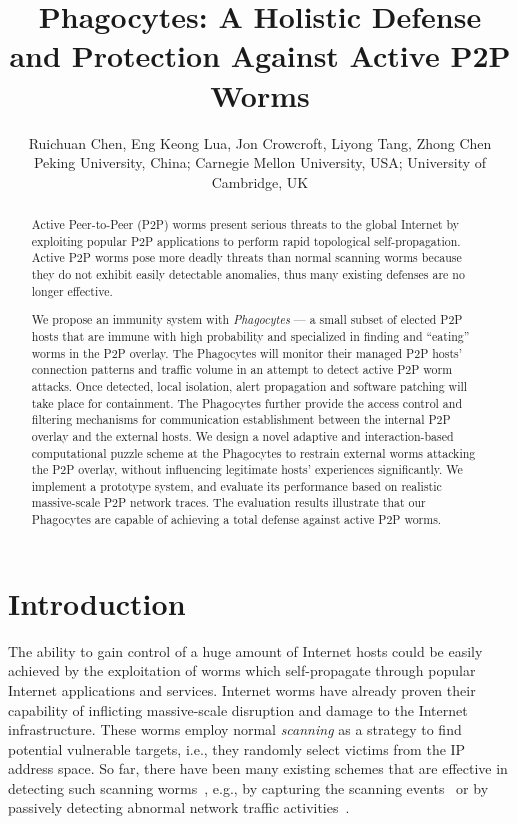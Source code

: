 \documentclass[times,10pt,twocolumn]{article}
\begin{document}
\title{Phagocytes: A Holistic Defense and Protection Against Active P2P Worms}

\author{Ruichuan Chen, Eng Keong Lua, Jon Crowcroft, Liyong Tang, Zhong Chen\\
Peking University, China; Carnegie Mellon University,
USA; University of Cambridge, UK}

\maketitle
\thispagestyle{empty}

\begin{abstract}

Active Peer-to-Peer (P2P) worms present serious threats to the
global Internet by exploiting popular P2P applications to perform
rapid topological self-propagation. Active P2P worms pose more
deadly threats than normal scanning worms because they do not
exhibit easily detectable anomalies, thus many existing defenses are
no longer effective.

We propose an immunity system with \emph{Phagocytes} --- a small
subset of elected P2P hosts that are immune with high probability
and specialized in finding and ``eating'' worms in the P2P overlay.
The Phagocytes will monitor their managed P2P hosts' connection
patterns and traffic volume in an attempt to detect active P2P worm
attacks. Once detected, local isolation, alert propagation and
software patching will take place for containment. The Phagocytes
further provide the access control and filtering mechanisms for
communication establishment between the internal P2P overlay and the
external hosts. We design a novel adaptive and interaction-based
computational puzzle scheme at the Phagocytes to restrain external
worms attacking the P2P overlay, without influencing legitimate
hosts' experiences significantly. We implement a prototype system,
and evaluate its performance based on realistic massive-scale P2P
network traces. The evaluation results illustrate that our
Phagocytes are capable of achieving a total defense against active
P2P worms.

\end{abstract}


\section{Introduction}

The ability to gain control of a huge amount of Internet hosts could
be easily achieved by the exploitation of worms which self-propagate
through popular Internet applications and services. Internet worms
have already proven their capability of inflicting massive-scale
disruption and damage to the Internet infrastructure. These worms
employ normal \emph{scanning} as a strategy to find potential
vulnerable targets, i.e., they randomly select victims from the IP
address space. So far, there have been many existing schemes that
are effective in detecting such scanning worms~\cite{li08survey},
e.g., by capturing the scanning events~\cite{VirtualHpot:Provos2004}
or by passively detecting abnormal network traffic
activities~\cite{Portscant:Jung2004}.
\end{document}
